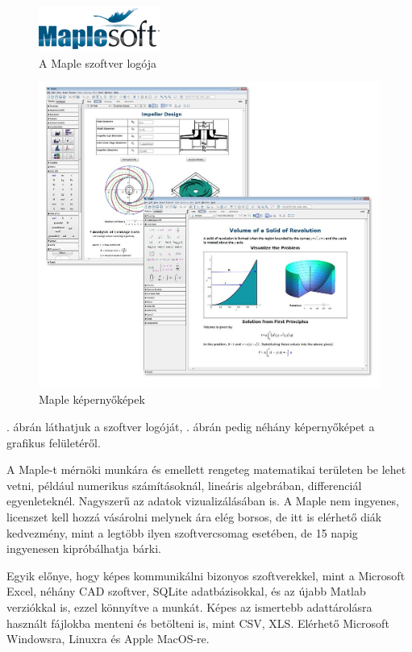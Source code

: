 \begin{figure}[h!]
\centering
\includegraphics{img/maple_logo.png}
\caption{A Maple szoftver logója}
\label{fig:maple-logo}
\end{figure}

\begin{figure}[h!]
\centering
\includegraphics[width=\textwidth]{img/Maple_screenshots.jpg}
\caption{Maple képernyőképek}
\label{fig:maple-screenshots}
\end{figure}

. ábrán láthatjuk a szoftver logóját, . ábrán pedig néhány képernyőképet a grafikus felületéről.

A Maple-t mérnöki munkára és emellett rengeteg matematikai területen be
lehet vetni, például numerikus számításoknál, lineáris algebrában,
differenciál egyenleteknél. Nagyszerű az adatok vizualizálásában is. A
Maple nem ingyenes, licenszet kell hozzá vásárolni melynek ára elég
borsos, de itt is elérhető diák kedvezmény, mint a legtöbb ilyen
szoftvercsomag esetében, de 15 napig ingyenesen kipróbálhatja bárki.

Egyik előnye, hogy képes kommunikálni bizonyos szoftverekkel, mint a
Microsoft Excel, néhány CAD szoftver, SQLite adatbázisokkal, és az újabb
Matlab verziókkal is, ezzel könnyítve a munkát. Képes az ismertebb
adattárolásra használt fájlokba menteni és betölteni is, mint CSV, XLS.
Elérhető Microsoft Windowsra, Linuxra és Apple MacOS-re.

